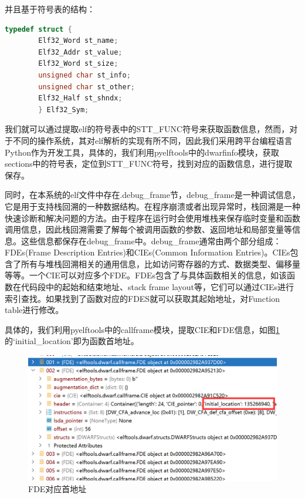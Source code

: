 \documentclass[12pt,a4paper]{ctexart}
\numberwithin{figure}{section}
\begin{document}
\par 并且基于符号表的结构：
\begin{lstlisting}[language=C]
    typedef struct { 
        Elf32_Word st_name; 
        Elf32_Addr st_value; 
        Elf32_Word st_size; 
        unsigned char st_info; 
        unsigned char st_other; 
        Elf32_Half st_shndx; 
        } Elf32_Sym;
\end{lstlisting}
\par 我们就可以通过提取elf的符号表中的STT\_FUNC符号来获取函数信息，然而，对于不同的操作系统，其对elf解析的实现有所不同，因此我们采用跨平台编程语言Python作为开发工具，具体的，我们利用pyelftools中的dwarfinfo模块，获取sections中的符号表，定位到STT\_FUNC符号，找到对应的函数信息，进行提取保存。
\par 同时，在本系统的elf文件中存在.debug\_frame节，debug\_frame是一种调试信息，它是用于支持栈回溯的一种数据结构。在程序崩溃或者出现异常时，栈回溯是一种快速诊断和解决问题的方法。由于程序在运行时会使用堆栈来保存临时变量和函数调用信息，因此栈回溯需要了解每个被调用函数的参数、返回地址和局部变量等信息。这些信息都保存在debug\_frame中。debug\_frame通常由两个部分组成：FDEs(Frame Description Entries)和CIEs(Common Information Entries)。CIEs包含了所有与堆栈回溯相关的通用信息，比如访问寄存器的方式、数据类型、偏移量等等。一个CIE可以对应多个FDE。FDEs包含了与具体函数相关的信息，如该函数在代码段中的起始和结束地址、stack frame layout等，它们可以通过CIEs进行索引查找。如果找到了函数对应的FDES就可以获取其起始地址，对Function table进行修改。
\par 具体的，我们利用pyelftools中的callframe模块，提取CIE和FDE信息，如图\ref{id}的‘initial\_location’即为函数首地址。
\begin{figure}
    \centering
    \includegraphics[scale=0.3]{graph/A.png}
    \caption{FDE对应首地址}
    \label{id}
\end{figure}
\end{document}
